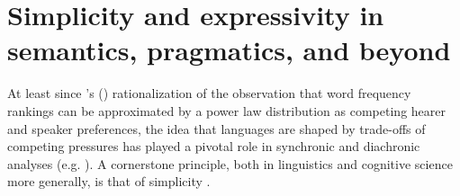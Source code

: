 \documentclass[a4paper]{article}
\newcommand{\citeposs}[2][]{\citeauthor{#2}'s (\citeyear[#1]{#2})}
\begin{document}


\section{Simplicity and expressivity in semantics, pragmatics, and beyond}
At least since \citeposs{zipf:1949} rationalization of the observation that word frequency rankings can be approximated by a power law distribution as competing hearer and speaker preferences, the idea that languages are shaped by trade-offs of competing pressures has played a pivotal role in synchronic and diachronic analyses (e.g. \citealt{martinet:1962, horn:1984,jaeger+vRooij:2007,jaeger:2007, piantadosi:2014,kirby+etal:2015}). A cornerstone principle, both in linguistics and cognitive science more generally, is that of simplicity \citep{chater+vitanyi:2003}. 

\end{document}
